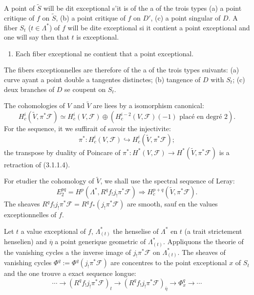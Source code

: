\documentclass[12pt,a4paper]{article}
\theoremstyle{plain}
\theoremstyle{definition}
\theoremstyle{remark}
\begin{document}
A point of $\widetilde{S}$ will be dit exceptional s'it is of the a of the trois types (a) a point critique of $f$ on $\widetilde{S}$, (b) a point critique of $f$ on $D'$, (c) a point singular of $D$. A fiber $S_t$ ($t \in \Lambda^*$) of $f$ will be dite exceptional si it contient a point exceptional and one will say then that $t$ is exceptional.
\begin{enumerate}[label=(D)]
\item Each fiber exceptional ne contient that a point exceptional.
\end{enumerate}


The fibers exceptionnelles are therefore of the a of the trois types suivants: (a) curve ayant a point double a tangentes distinctes; (b) tangence of $D$ with $S_t$; (c) deux branches of $D$ se coupent on $S_t$.

The cohomologies of $V$ and $\widetilde{V}$ are liees by a isomorphism canonical:
\begin{equation}\label{eq:3.1.1.3}
H_c^i(\widetilde{V}, \pi^*\mathscr{F}) \simeq H_c^i(V, \mathscr{F}) \oplus (H_c^{i-2}(V, \mathscr{F})(-1) \text{ plac\'e en degr\'e } 2).
\end{equation}
For the sequence, it we suffirait of savoir the injectivite:
\begin{equation}\label{eq:3.1.1.4}
\pi^* : H_c^i(V, \mathscr{F}) \hookrightarrow H_c^i(\widetilde{V}, \pi^*\mathscr{F});
\end{equation}
the transpose by duality of Poincare of $\pi^* : H^*(V, \mathscr{F}) \to H^*(\widetilde{V}, \pi^*\mathscr{F})$ is a retraction of (3.1.1.4).

For etudier the cohomology of $\widetilde{V}$, we shall use the spectral sequence of Leray:
\begin{equation}\label{eq:3.1.1.5}
E_2^{pq} = H^p(\Lambda^*, R^q f_! j_! \pi^* \mathscr{F}) \Rightarrow H_c^{p+q}(\widetilde{V}, \pi^*\mathscr{F}).
\end{equation}
The sheaves $R^q f_! j_! \pi^*\mathscr{F} = R^q f_*(j_! \pi^*\mathscr{F})$ are smooth, sauf en the values exceptionnelles of $f$.

Let $t$ a value exceptional of $f$, $\Lambda^*_{(t)}$ the henselise of $\Lambda^*$ en $t$ (a trait strictement henselien) and $\overline{\eta}$ a point generique geometric of $\Lambda^*_{(t)}$. Appliquons the theorie of the vanishing cycles a the inverse image of $j_! \pi^*\mathscr{F}$ on $\Lambda^*_{(t)}$. The sheaves of vanishing cycles $\Phi^q := \Phi^q(j_! \pi^*\mathscr{F})$ are concentres to the point exceptional $x$ of $S_t$ and the one trouve a exact sequence longue:
\begin{equation}\label{eq:3.1.1.6}
\cdots \to (R^q f_! j_! \pi^*\mathscr{F})_t \to (R^q f_! j_! \pi^*\mathscr{F})_{\overline{\eta}} \to \Phi^q_x \to \cdots
\end{equation}
\end{document}
